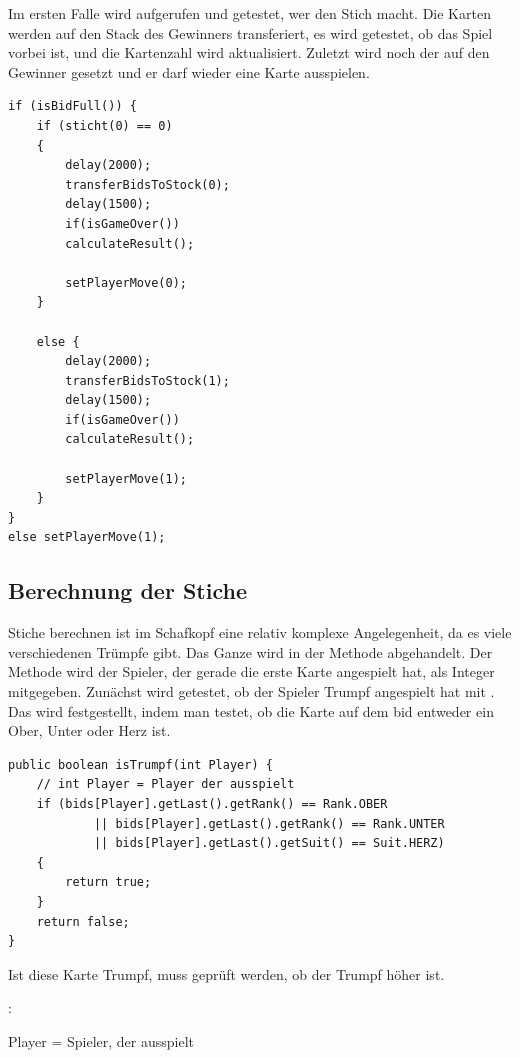 Im ersten Falle wird  aufgerufen und getestet, wer den Stich
macht. Die Karten werden auf den Stack des Gewinners transferiert, es wird
getestet, ob das Spiel vorbei ist, und die Kartenzahl wird aktualisiert.
Zuletzt wird noch der  auf den Gewinner gesetzt und er darf
wieder eine Karte ausspielen.

\begin{lstlisting}[caption={initPlayers gamecycle},captionpos=b]
if (isBidFull()) {
    if (sticht(0) == 0)
    {
        delay(2000);
        transferBidsToStock(0);
        delay(1500);
        if(isGameOver())
        calculateResult();

        setPlayerMove(0);
    }

    else {
        delay(2000);
        transferBidsToStock(1);
        delay(1500);
        if(isGameOver())
        calculateResult();

        setPlayerMove(1);
    }
}
else setPlayerMove(1);
\end{lstlisting}

\subsection{Berechnung der Stiche}

Stiche berechnen ist im Schafkopf eine relativ komplexe Angelegenheit, da es
viele verschiedenen Trümpfe gibt. Das Ganze wird in der Methode
 abgehandelt. Der Methode wird der Spieler, der gerade
die erste Karte angespielt hat, als Integer mitgegeben. Zunächst wird getestet,
ob der Spieler Trumpf angespielt hat mit . Das wird
festgestellt, indem man testet, ob die Karte auf dem bid entweder ein Ober,
Unter oder Herz ist.

\begin{lstlisting}[caption={isTrumpf Methode},captionpos=b]
public boolean isTrumpf(int Player) {
    // int Player = Player der ausspielt
    if (bids[Player].getLast().getRank() == Rank.OBER
            || bids[Player].getLast().getRank() == Rank.UNTER
            || bids[Player].getLast().getSuit() == Suit.HERZ)
    {
        return true;
    }
    return false;
}
\end{lstlisting}

Ist diese Karte Trumpf, muss geprüft werden, ob der Trumpf höher ist.

: 

Player = Spieler, der ausspielt


